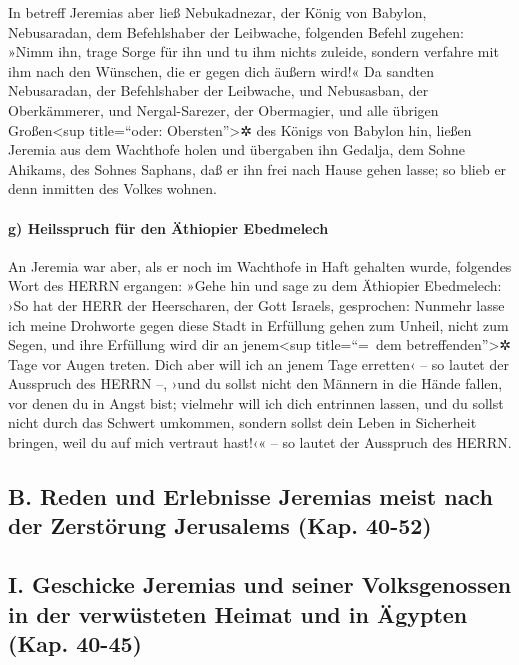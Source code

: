 In betreff Jeremias aber ließ Nebukadnezar, der König von
Babylon, Nebusaradan, dem Befehlshaber der Leibwache, folgenden Befehl
zugehen: »Nimm ihn, trage Sorge für ihn und tu ihm nichts
zuleide, sondern verfahre mit ihm nach den Wünschen, die er gegen dich
äußern wird!« Da sandten Nebusaradan, der Befehlshaber
der Leibwache, und Nebusasban, der Oberkämmerer, und Nergal-Sarezer, der
Obermagier, und alle übrigen Großen\textless sup title=``oder:
Obersten''\textgreater✲ des Königs von Babylon hin,
ließen Jeremia aus dem Wachthofe holen und übergaben ihn
Gedalja, dem Sohne Ahikams, des Sohnes Saphans, daß er ihn frei nach
Hause gehen lasse; so blieb er denn inmitten des Volkes wohnen.

\hypertarget{g-heilsspruch-fuxfcr-den-uxe4thiopier-ebedmelech}{%
\paragraph{g) Heilsspruch für den Äthiopier
Ebedmelech}\label{g-heilsspruch-fuxfcr-den-uxe4thiopier-ebedmelech}}

An Jeremia war aber, als er noch im Wachthofe in Haft
gehalten wurde, folgendes Wort des HERRN ergangen: »Gehe
hin und sage zu dem Äthiopier Ebedmelech: ›So hat der HERR der
Heerscharen, der Gott Israels, gesprochen: Nunmehr lasse ich meine
Drohworte gegen diese Stadt in Erfüllung gehen zum Unheil, nicht zum
Segen, und ihre Erfüllung wird dir an jenem\textless sup title=``=~dem
betreffenden''\textgreater✲ Tage vor Augen treten. Dich
aber will ich an jenem Tage erretten‹ -- so lautet der Ausspruch des
HERRN --, ›und du sollst nicht den Männern in die Hände fallen, vor
denen du in Angst bist; vielmehr will ich dich entrinnen
lassen, und du sollst nicht durch das Schwert umkommen, sondern sollst
dein Leben in Sicherheit bringen, weil du auf mich vertraut hast!‹« --
so lautet der Ausspruch des HERRN.

\hypertarget{b.-reden-und-erlebnisse-jeremias-meist-nach-der-zerstuxf6rung-jerusalems-kap.-40-52}{%
\subsection{B. Reden und Erlebnisse Jeremias meist nach der Zerstörung
Jerusalems (Kap.
40-52)}\label{b.-reden-und-erlebnisse-jeremias-meist-nach-der-zerstuxf6rung-jerusalems-kap.-40-52}}

\hypertarget{i.-geschicke-jeremias-und-seiner-volksgenossen-in-der-verwuxfcsteten-heimat-und-in-uxe4gypten-kap.-40-45}{%
\subsection{I. Geschicke Jeremias und seiner Volksgenossen in der
verwüsteten Heimat und in Ägypten (Kap.
40-45)}\label{i.-geschicke-jeremias-und-seiner-volksgenossen-in-der-verwuxfcsteten-heimat-und-in-uxe4gypten-kap.-40-45}}


